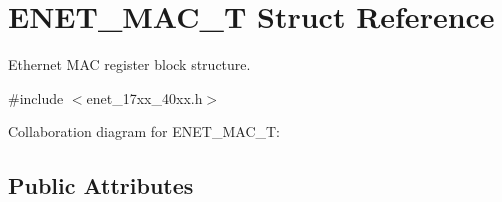 \hypertarget{structENET__MAC__T}{}\section{E\+N\+E\+T\+\_\+\+M\+A\+C\+\_\+T Struct Reference}
\label{structENET__MAC__T}


Ethernet M\+AC register block structure.  




{\ttfamily \#include $<$enet\+\_\+17xx\+\_\+40xx.\+h$>$}



Collaboration diagram for E\+N\+E\+T\+\_\+\+M\+A\+C\+\_\+T\+:
\subsection*{Public Attributes}
